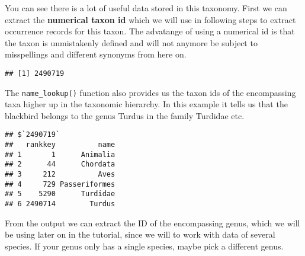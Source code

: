 \documentclass[]{article}
\newenvironment{Shaded}{\begin{snugshade}}{\end{snugshade}}
\newcommand{\NormalTok}[1]{#1}
\newcommand{\OperatorTok}[1]{\textcolor[rgb]{0.81,0.36,0.00}{\textbf{#1}}}
\newcommand{\StringTok}[1]{\textcolor[rgb]{0.31,0.60,0.02}{#1}}
\begin{document}
You can see there is a lot of useful data stored in this taxonomy. First
we can extract the \textbf{numerical taxon id} which we will use in
following steps to extract occurrence records for this taxon. The
advatange of using a numerical id is that the taxon is unmistakenly
defined and will not anymore be subject to misspellings and different
synonyms from here on.

\begin{Shaded}
\end{Shaded}

\begin{verbatim}
## [1] 2490719
\end{verbatim}

The \texttt{name\_lookup()} function also provides us the taxon ids of
the encompassing taxa higher up in the taxonomic hierarchy. In this
example it tells us that the blackbird belongs to the genus Turdus in
the family Turdidae etc.

\begin{Shaded}
\end{Shaded}

\begin{verbatim}
## $`2490719`
##   rankkey          name
## 1       1      Animalia
## 2      44      Chordata
## 3     212          Aves
## 4     729 Passeriformes
## 5    5290      Turdidae
## 6 2490714        Turdus
\end{verbatim}

From the output we can extract the ID of the encompassing genus, which
we will be using later on in the tutorial, since we will to work with
data of several species. If your genus only has a single species, maybe
pick a different genus.

\begin{Shaded}
\end{Shaded}
\end{document}
